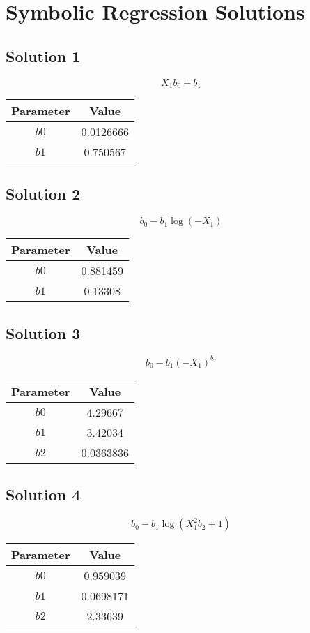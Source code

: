 \documentclass{article}
\begin{document}
        \section*{Symbolic Regression Solutions}
        \subsection*{Solution 1}
\[
X_{1} b_{0} + b_{1}
\]
\begin{center}
\begin{tabular}{cc}
\toprule
Parameter & Value \\
\midrule
$b0$ & 0.0126666 \\
$b1$ & 0.750567 \\
\bottomrule
\end{tabular}
\end{center}

\vspace{1em}
\subsection*{Solution 2}
\[
b_{0} - b_{1} \log{\left(- X_{1} \right)}
\]
\begin{center}
\begin{tabular}{cc}
\toprule
Parameter & Value \\
\midrule
$b0$ & 0.881459 \\
$b1$ & 0.13308 \\
\bottomrule
\end{tabular}
\end{center}

\vspace{1em}
\subsection*{Solution 3}
\[
b_{0} - b_{1} \left(- X_{1}\right)^{b_{2}}
\]
\begin{center}
\begin{tabular}{cc}
\toprule
Parameter & Value \\
\midrule
$b0$ & 4.29667 \\
$b1$ & 3.42034 \\
$b2$ & 0.0363836 \\
\bottomrule
\end{tabular}
\end{center}

\vspace{1em}
\subsection*{Solution 4}
\[
b_{0} - b_{1} \log{\left(X_{1}^{2} b_{2} + 1 \right)}
\]
\begin{center}
\begin{tabular}{cc}
\toprule
Parameter & Value \\
\midrule
$b0$ & 0.959039 \\
$b1$ & 0.0698171 \\
$b2$ & 2.33639 \\
\bottomrule
\end{tabular}
\end{center}
\end{document}
